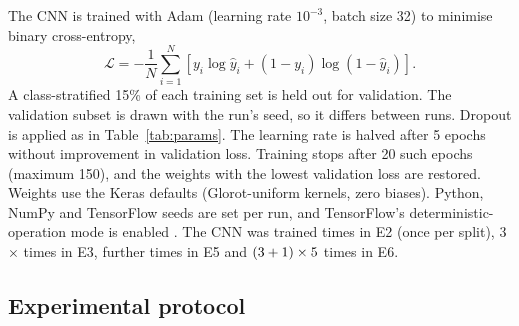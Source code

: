\documentclass[5p,times,twocolumn]{elsarticle}
\begin{document}
The CNN is trained with Adam \cite{kingma2015} (learning rate $10^{-3}$, batch size 32) to minimise binary cross-entropy,
\begin{equation}
\mathcal{L} = -\frac{1}{N}\sum_{i=1}^{N}\left[y_i\log\hat{y}_i + (1-y_i)\log(1-\hat{y}_i)\right].
\end{equation}
A class-stratified 15\% of each training set is held out for validation. The validation subset is drawn with the run's seed, so it differs between runs. Dropout \cite{srivastava2014} is applied as in Table~\ref{tab:params}. The learning rate is halved after 5 epochs without improvement in validation loss. Training stops after 20 such epochs (maximum 150), and the weights with the lowest validation loss are restored. Weights use the Keras defaults (Glorot-uniform kernels, zero biases). Python, NumPy and TensorFlow seeds are set per run, and TensorFlow's deterministic-operation mode is enabled \cite{abadi2016}. The CNN was trained \NSplits{} times in E2 (once per split), 3$\times$\NSplits{} times in E3, \NInits{} further times in E5 and $(3+1)\times5$ times in E6.

\subsection{Experimental protocol}
\label{sec:protocol}
\end{document}
